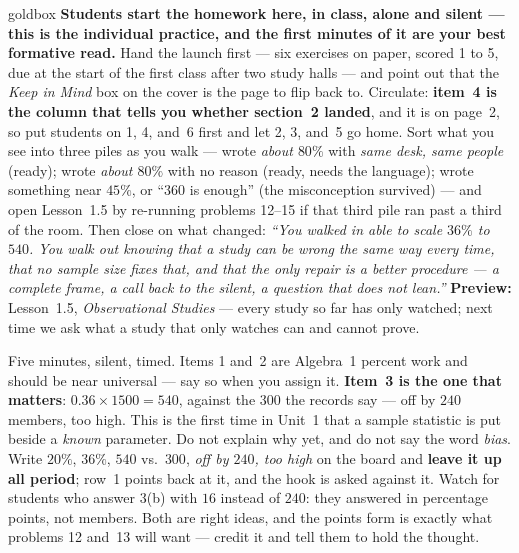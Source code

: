 \documentclass[10pt]{article}
\begin{document}
\boxguard
\begin{skillbox}{goldbox}
\textbf{Students start the homework here, in class, alone and silent --- this is the individual
practice, and the first minutes of it are your best formative read.} Hand the launch first ---
six exercises on paper, scored 1 to 5, due at the start of the first class after two study
halls --- and point out that the \emph{Keep in Mind} box on the cover is the page to flip back
to. Circulate: \textbf{item~4 is the column that tells you whether section~2 landed}, and it is
on page~2, so put students on 1, 4, and~6 first and let 2, 3, and~5 go home. Sort what you see
into three piles as you walk --- wrote \emph{about $80\%$} with \emph{same desk, same people}
(ready); wrote \emph{about $80\%$} with no reason (ready, needs the language); wrote something
near $45\%$, or ``$360$ is enough'' (the misconception survived) --- and open Lesson~1.5 by
re-running problems 12--15 if that third pile ran past a third of the room. Then close
on what changed: \emph{``You walked in able to scale $36\%$ to $540$. You walk out knowing that
a study can be wrong the same way every time, that no sample size fixes that, and that the only
repair is a better procedure --- a complete frame, a call back to the silent, a question that
does not lean.''} \textbf{Preview:} Lesson~1.5, \emph{Observational Studies} --- every study so
far has only watched; next time we ask what a study that only watches can and cannot prove.
\end{skillbox}

\begin{teachernote}[Warm-Up]
Five minutes, silent, timed. Items 1 and~2 are Algebra~1 percent work and should be near
universal --- say so when you assign it. \textbf{Item~3 is the one that matters}: $0.36
\times 1500 = 540$, against the $300$ the records say --- off by $240$ members, too high.
This is the first time in Unit~1 that a sample statistic is put beside a \emph{known}
parameter. Do not explain why yet, and do not say the word \emph{bias}. Write $20\%$, $36\%$,
$540$ vs.\ $300$, \emph{off by $240$, too high} on the board and \textbf{leave it up all
period}; row~1 points back at it, and the hook is asked against it. Watch for students who
answer 3(b) with $16$ instead of $240$: they answered in percentage points, not members. Both
are right ideas, and the points form is exactly what problems 12 and~13 will want ---
credit it and tell them to hold the thought.
\end{teachernote}
\end{document}
